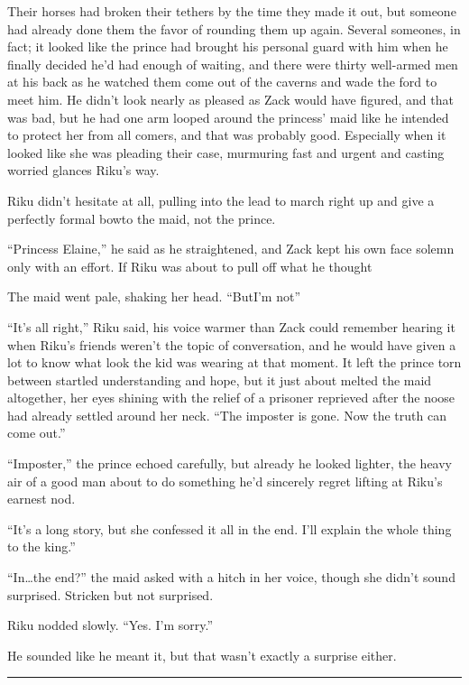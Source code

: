 Their horses had broken their tethers by the time they made it out, but someone had already done them the favor of rounding them up again. Several someones, in fact; it looked like the prince had brought his personal guard with him when he finally decided he'd had enough of waiting, and there were thirty well-armed men at his back as he watched them come out of the caverns and wade the ford to meet him. He didn't look nearly as pleased as Zack would have figured, and that was bad, but he had one arm looped around the princess' maid like he intended to protect her from all comers, and that was probably good. Especially when it looked like she was pleading their case, murmuring fast and urgent and casting worried glances Riku's way.

Riku didn't hesitate at all, pulling into the lead to march right up and give a perfectly formal bow\textemdash to the maid, not the prince.

``Princess Elaine,'' he said as he straightened, and Zack kept his own face solemn only with an effort. If Riku was about to pull off what he thought\textemdash 

The maid went pale, shaking her head. ``But\textemdash I'm not\textemdash ''

``It's all right,'' Riku said, his voice warmer than Zack could remember hearing it when Riku's friends weren't the topic of conversation, and he would have given a lot to know what look the kid was wearing at that moment. It left the prince torn between startled understanding and hope, but it just about melted the maid altogether, her eyes shining with the relief of a prisoner reprieved after the noose had already settled around her neck. ``The imposter is gone. Now the truth can come out.''

``Imposter,'' the prince echoed carefully, but already he looked lighter, the heavy air of a good man about to do something he'd sincerely regret lifting at Riku's earnest nod.

``It's a long story, but she confessed it all in the end. I'll explain the whole thing to the king.''

``In\ldots the end?'' the maid asked with a hitch in her voice, though she didn't sound surprised. Stricken but not surprised.

Riku nodded slowly. ``Yes. I'm sorry.''

He sounded like he meant it, but that wasn't exactly a surprise either.

\fancybreak{\pfbreakdisplay}


